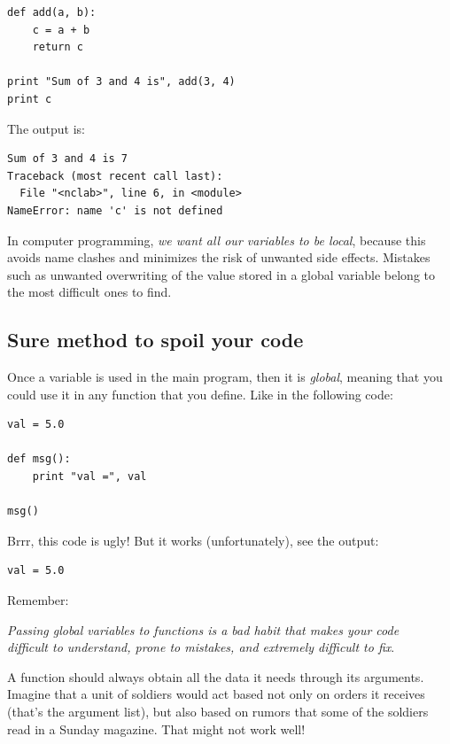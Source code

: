 \begin{verbatim}
def add(a, b):
    c = a + b
    return c

print "Sum of 3 and 4 is", add(3, 4)
print c
\end{verbatim}
The output is:

\begin{verbatim}
Sum of 3 and 4 is 7
Traceback (most recent call last):
  File "<nclab>", line 6, in <module>
NameError: name 'c' is not defined
\end{verbatim}
In computer programming, {\em we want all our variables to be local}, because 
this avoids name clashes and minimizes the risk of unwanted side effects.
Mistakes such as unwanted overwriting of the value stored in a global variable 
belong to the most difficult ones to find.

\subsection{Sure method to spoil your code}

Once a variable is used in the main program, 
then it is {\em global}, meaning that you could use it in 
any function that you define. Like in the following 
code:

\begin{verbatim}
val = 5.0

def msg():
    print "val =", val

msg()
\end{verbatim}
Brrr, this code is ugly! But it works (unfortunately), see the output:

\begin{verbatim}
val = 5.0
\end{verbatim}
Remember:\\

\begin{center}
{\em Passing global variables to functions is a bad habit that makes your code\\
     difficult to understand, prone to mistakes, and extremely difficult to fix}.\\
\end{center}
\vspace{4mm}
\noindent
A function should always
obtain all the data it needs through its arguments. Imagine that a unit of soldiers 
would act based not only on orders it receives (that's the argument 
list), but also based on rumors that some of the soldiers read in a Sunday magazine. 
That might not work well!\\


